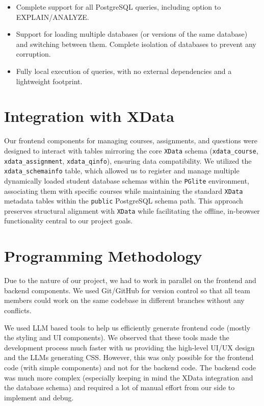 \documentclass[11pt]{article}
\begin{document}
\begin{itemize}
    \item Complete support for all PostgreSQL queries, including option to EXPLAIN/ANALYZE.
    \item Support for loading multiple databases (or versions of the same database) and switching between them. Complete isolation of databases to prevent any corruption.
    \item Fully local execution of queries, with no external dependencies and a lightweight footprint.
\end{itemize}

\section{Integration with XData}

Our frontend components for managing courses, assignments, and questions were designed to interact with tables mirroring the core \texttt{XData} schema (\texttt{xdata\_course}, \texttt{xdata\_assignment}, \texttt{xdata\_qinfo}), ensuring data compatibility. We utilized the \texttt{xdata\_schemainfo} table, which allowed us to register and manage multiple dynamically loaded student database schemas within the \texttt{PGlite} environment, associating them with specific courses while maintaining the standard \texttt{XData} metadata tables within the \texttt{public} PostgreSQL schema path. This approach preserves structural alignment with \texttt{XData} while facilitating the offline, in-browser functionality central to our project goals.


\section{Programming Methodology}

Due to the nature of our project, we had to work in parallel on the frontend and backend components. We used Git/GitHub for version control so that all team members could work on the same codebase in different branches without any conflicts. 


We used LLM based tools to help us efficiently generate frontend code (mostly the styling and UI components). We observed that these tools made the development process much faster with us providing the high-level UI/UX design and the LLMs generating CSS. However, this was only possible for the frontend code (with simple components) and not for the backend code. The backend code was much more complex (especially keeping in mind the XData integration and the database schema) and required a lot of manual effort from our side to implement and debug.
\end{document}
